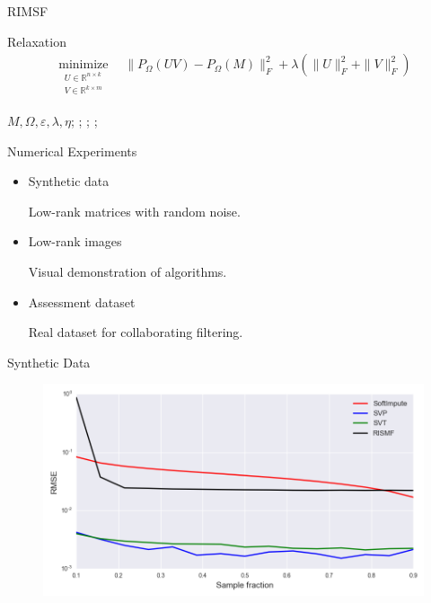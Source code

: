 \documentclass{beamer}
\begin{document}
\begin{frame}{RIMSF}

\begin{block}{Relaxation}
	\vspace{-0.3cm}
	\begin{align*}
	\mathop{\text{minimize}}\limits_{\substack{	U \in \mathbb{R}^{n \times k} \\ V \in \mathbb{R}^{k \times m}}} \quad \|P_{\Omega} (UV) - P_{\Omega} (M)\|_F^2 + \lambda \left(\| U \|^2_F + \| V \|^2_F\right)
	\end{align*}
\end{block}
	
\begin{algorithmic}[1]
	\REQUIRE $M, \Omega, \varepsilon, \lambda, \eta$;
	;
	;
	\REPEAT
	;
	\ENDFOR
\end{algorithmic}
\end{frame}
\begin{frame}{Numerical Experiments}
\begin{itemize}
	\item Synthetic data
	
	Low-rank matrices with random noise.
	\item Low-rank images
	
	Visual demonstration of algorithms.
	\item Assessment dataset
	
	Real dataset for collaborating filtering.
\end{itemize}

\end{frame}
\begin{frame}{Synthetic Data}
	\begin{figure}[h]
		\centering
		\includegraphics[width=1\linewidth]{./../results/synthetic/exper_1/synthetic_nsamp_rmse.png}
		\label{heat_map}
	\end{figure}
\end{frame}
\end{document}
